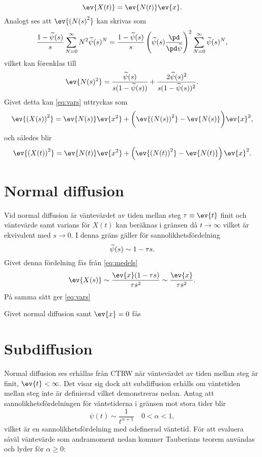 \begin{equation}\label{eq:medelt}
   \ev{X(t)} = \ev{N(t)}\ev{x}.
\end{equation}
Analogt ses att $\ev{\left(N(s\right)^2}$ kan skrivas som
\begin{equation}
   \frac{1-\psis (s)}{s}\sum_{N=0}^{\infty}N^2\psis (s)^N = \frac{1-\psis (s)}{s}\left(\psis (s)\frac{\pd}{\pd \psis} \right)^2\sum_{N=0}^{\infty}\psis (s)^N,
\end{equation}
vilket kan förenklas till 
\begin{equation}
   \ev{N(s)^2} = \frac{\psis (s)}{s(1-\psis (s))}+\frac{2\psis (s)^2}{s(1-\psis (s))^2}.
\end{equation}
Givet detta kan \eqref{eq:vars} uttryckas som 
\begin{equation}
   \ev{\left(X(s)\right)^2} = \ev{N(s)}\ev{x^2}+\bigg (\ev{\left(N(s)\right)^2}-\ev{N(s)}\bigg )\ev{x}^2,
\end{equation}
och således blir
\begin{equation}\label{eq:vart}
      \ev{\left(X(t)\right)^2} = \ev{N(t)}\ev{x^2}+\left(\ev{\left(N(t)\right)^2}-\ev{N(t)}\right)\ev{x}^2.
\end{equation}






\section{Normal diffusion}
Vid normal diffusion är väntevärdet av tiden mellan steg $\tau\equiv\ev{t}$ finit och väntevärde samt varians för $X(t)$ kan beräknas i gränsen då $t\to\infty$ vilket är ekvivalent med $s\to0$. I denna gräns gäller för sannolikhetsfördelning 
\begin{equation}
\widetilde{\psi} (s) \sim 1-\tau s.
\end{equation}
Givet denna fördelning fås från \eqref{eq:medels}
\begin{equation}
   \ev{X(s)}\sim \frac{\ev{x}(1-\tau s)}{\tau s^2}\sim\frac{\ev{x}}{\tau s^2}.
\end{equation}
På samma sätt ger \eqref{eq:vars}

Givet normal diffusion samt $\ev{x}=0$ fås 

\section{Subdiffusion}

Normal diffusion ses erhållas från CTRW när väntevärdet av tiden mellan steg är finit, $\ev{t}<\infty$. Det visar sig dock att subdiffusion erhålls om väntetiden mellan steg inte är definierad vilket demonstreras nedan. Antag att sannolikhetsfördelningen för väntetiderna i gränsen mot stora tider blir 
\begin{equation}
\psi(t) \sim \frac{1}{t^{\alpha+1}}\quad 0<\alpha<1,
\end{equation}
vilket är en sannolikhetsfördelning med odefinerad väntetid. För att evaluera såväl väntevärde som andramoment nedan kommer Tauberians teorem\cite{Feller_prob1971} användas och lyder för $\alpha\geq0$:

